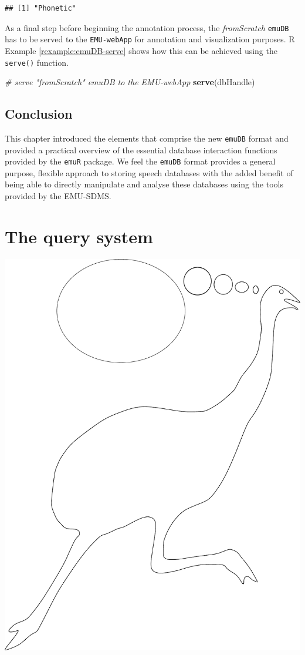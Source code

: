 \documentclass[]{book}
\newenvironment{Shaded}{\begin{snugshade}}{\end{snugshade}}
\newcommand{\CommentTok}[1]{\textcolor[rgb]{0.56,0.35,0.01}{\textit{#1}}}
\newcommand{\KeywordTok}[1]{\textcolor[rgb]{0.13,0.29,0.53}{\textbf{#1}}}
\newcommand{\NormalTok}[1]{#1}
\theoremstyle{definition}
\theoremstyle{definition}
\theoremstyle{definition}
\theoremstyle{remark}
\begin{document}
\begin{verbatim}
## [1] "Phonetic"
\end{verbatim}

As a final step before beginning the annotation process, the
\emph{fromScratch} \texttt{emuDB} has to be served to the
\texttt{EMU-webApp} for annotation and visualization purposes. R Example
\ref{rexample:emuDB-serve} shows how this can be achieved using the
\texttt{serve()} function.

\begin{Shaded}
\begin{Highlighting}[]
\CommentTok{# serve "fromScratch" emuDB to the EMU-webApp}
\KeywordTok{serve}\NormalTok{(dbHandle)}
\end{Highlighting}
\end{Shaded}

\hypertarget{conclusion-2}{%
\section{Conclusion}\label{conclusion-2}}

This chapter introduced the elements that comprise the new
\texttt{emuDB} format and provided a practical overview of the essential
database interaction functions provided by the \texttt{emuR} package. We
feel the \texttt{emuDB} format provides a general purpose, flexible
approach to storing speech databases with the added benefit of being
able to directly manipulate and analyse these databases using the tools
provided by the EMU-SDMS.

\hypertarget{chap:querysys}{%
\chapter{The query system}\label{chap:querysys}}

\begin{center}\includegraphics[width=0.5\linewidth]{pics/EMU-webAppEmu_query} \end{center}
\end{document}
